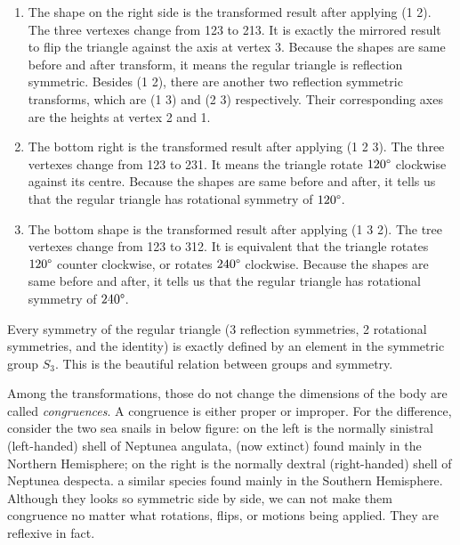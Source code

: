 \documentclass[b5paper]{article}
\begin{document}
\begin{enumerate}
\item The shape on the right side is the transformed result after applying (1 2). The three vertexes change from 123 to 213. It is exactly the mirrored result to flip the triangle against the axis at vertex 3. Because the shapes are same before and after transform, it means the regular triangle is reflection symmetric. Besides (1 2), there are another two reflection symmetric transforms, which are (1 3) and (2 3) respectively. Their corresponding axes are the heights at vertex 2 and 1.

\item The bottom right is the transformed result after applying (1 2 3). The three vertexes change from 123 to 231. It means the triangle rotate $120\degree$ clockwise against its centre. Because the shapes are same before and after, it tells us that the regular triangle has rotational symmetry of $120\degree$.

\item The bottom shape is the transformed result after applying (1 3 2). The tree vertexes change from 123 to 312. It is equivalent that the triangle rotates $120\degree$ counter clockwise, or rotates $240\degree$ clockwise. Because the shapes are same before and after, it tells us that the regular triangle has rotational symmetry of $240\degree$.

\end{enumerate}

Every symmetry of the regular triangle (3 reflection symmetries, 2 rotational symmetries, and the identity) is exactly defined by an element in the symmetric group $S_3$. This is the beautiful relation between groups and symmetry.

Among the transformations, those do not change the dimensions of the body are called {\em congruences}. A congruence is either proper or improper. For the difference, consider the two sea snails in below figure: on the left is the normally sinistral (left-handed) shell of Neptunea angulata, (now extinct) found mainly in the Northern Hemisphere; on the right is the normally dextral (right-handed) shell of Neptunea despecta. a similar species found mainly in the Southern Hemisphere. Although they looks so symmetric side by side, we can not make them congruence no matter what rotations, flips, or motions being applied. They are reflexive in fact.
\end{document}
